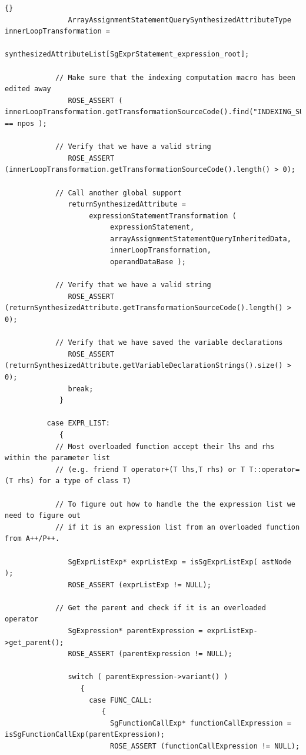 \documentclass[10pt]{article}
\begin{document}
{\begin{lstlisting}{}
               ArrayAssignmentStatementQuerySynthesizedAttributeType innerLoopTransformation =
                    synthesizedAttributeList[SgExprStatement_expression_root];

            // Make sure that the indexing computation macro has been edited away
               ROSE_ASSERT ( innerLoopTransformation.getTransformationSourceCode().find("INDEXING_SUBSCRIPT_COMPUTATION") == npos );

            // Verify that we have a valid string
               ROSE_ASSERT (innerLoopTransformation.getTransformationSourceCode().length() > 0);

            // Call another global support
               returnSynthesizedAttribute =
                    expressionStatementTransformation (
                         expressionStatement,
                         arrayAssignmentStatementQueryInheritedData,
                         innerLoopTransformation,
                         operandDataBase );

            // Verify that we have a valid string
               ROSE_ASSERT (returnSynthesizedAttribute.getTransformationSourceCode().length() > 0);

            // Verify that we have saved the variable declarations
               ROSE_ASSERT (returnSynthesizedAttribute.getVariableDeclarationStrings().size() > 0);
               break;
             }

          case EXPR_LIST:
             {
            // Most overloaded function accept their lhs and rhs within the parameter list
            // (e.g. friend T operator+(T lhs,T rhs) or T T::operator=(T rhs) for a type of class T)

            // To figure out how to handle the the expression list we need to figure out
            // if it is an expression list from an overloaded function from A++/P++.

               SgExprListExp* exprListExp = isSgExprListExp( astNode );
               ROSE_ASSERT (exprListExp != NULL);

            // Get the parent and check if it is an overloaded operator
               SgExpression* parentExpression = exprListExp->get_parent();
               ROSE_ASSERT (parentExpression != NULL);

               switch ( parentExpression->variant() )
                  {
                    case FUNC_CALL:
                       {
                         SgFunctionCallExp* functionCallExpression = isSgFunctionCallExp(parentExpression);
                         ROSE_ASSERT (functionCallExpression != NULL);


\end{lstlisting}}
\end{document}

